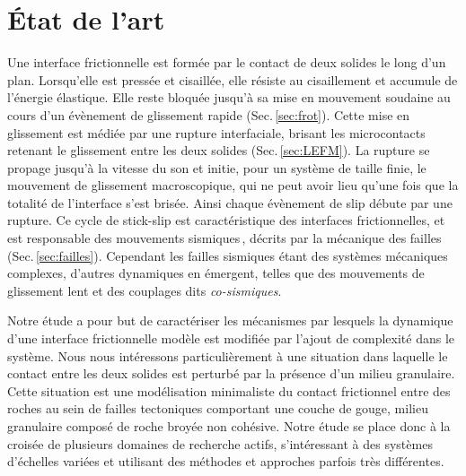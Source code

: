 \chapter{État de l'art}
\label{chap:etatdelart}

Une interface frictionnelle est formée par le contact de deux solides le long d'un plan. Lorsqu'elle est pressée et cisaillée, elle résiste au cisaillement et accumule de l'énergie élastique. Elle reste bloquée jusqu'à sa mise en mouvement soudaine au cours d'un évènement de glissement rapide (Sec.\,\ref{sec:frot}). Cette mise en glissement est médiée par une rupture interfaciale, brisant les microcontacts retenant le glissement entre les deux solides (Sec.\,\ref{sec:LEFM}). La rupture se propage jusqu'à la vitesse du son et initie, pour un système de taille finie, le mouvement de glissement macroscopique, qui ne peut avoir lieu qu'une fois que la totalité de l'interface s'est brisée. Ainsi chaque évènement de slip débute par une rupture. Ce cycle de stick-slip est caractéristique des interfaces frictionnelles, et est responsable des mouvements sismiques\,\cite{brace_stick-slip_1966}, décrits par la mécanique des failles (Sec.\,\ref{sec:failles}). Cependant les failles sismiques étant des systèmes mécaniques complexes, d'autres dynamiques en émergent, telles que des mouvements de glissement lent et des couplages dits \textit{co-sismiques}.

Notre étude a pour but de caractériser les mécanismes par lesquels la dynamique d'une interface frictionnelle modèle est modifiée par l'ajout de complexité dans le système. Nous nous intéressons particulièrement à une situation dans laquelle le contact entre les deux solides est perturbé par la présence d'un milieu granulaire. Cette situation est une modélisation minimaliste du contact frictionnel entre des roches au sein de failles tectoniques comportant une couche de gouge, milieu granulaire composé de roche broyée non cohésive. Notre étude se place donc à la croisée de plusieurs domaines de recherche actifs, s'intéressant à des systèmes d'échelles variées et utilisant des méthodes et approches parfois très différentes.


